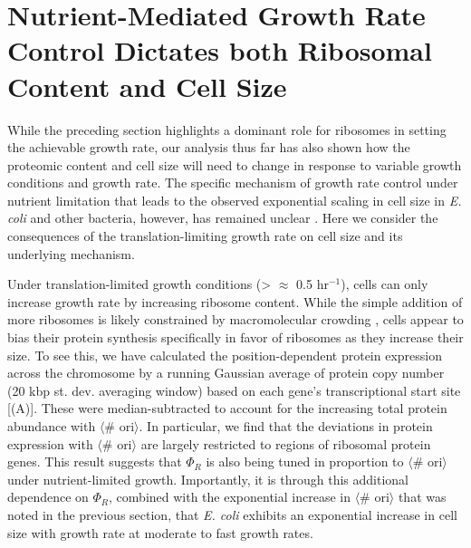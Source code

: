 \section{Nutrient-Mediated Growth Rate Control Dictates both Ribosomal Content and Cell Size}
\label{sec:minimal_model}
While the preceding section highlights a dominant role for ribosomes in setting
the achievable growth rate, our analysis thus far has also shown how the
proteomic content and cell size will need to change in response to variable
growth conditions and growth rate. The specific mechanism of growth rate control
under nutrient limitation that leads to the observed exponential scaling in cell
size in \textit{E. coli} and other bacteria, however, has remained unclear
\citep{si2017, harris2018, ojkic2019}. Here we consider the consequences of the
translation-limiting growth rate on cell size and its underlying mechanism.

Under translation-limited growth conditions (> $\approx$ 0.5 hr$^{-1}$), cells can
only increase growth rate by increasing ribosome content. While the simple
addition of more ribosomes is likely constrained by macromolecular crowding
\citep{delarue2018, solerbistue2020}, cells appear to bias their protein
synthesis specifically in favor of ribosomes as they increase their size. To see
this, we have calculated the position-dependent protein expression across the
chromosome by a running Gaussian average of protein copy number (20 kbp st. dev.
averaging window) based on each gene's transcriptional start site
[(A)]. These were median-subtracted to account  for
the increasing total protein abundance with $\langle$\# ori$\rangle$. In
particular, we find that the deviations in protein expression with $\langle$\#
ori$\rangle$ are largely restricted to regions of ribosomal protein genes. This
result suggests that $\Phi_R$ is also being tuned in proportion to $\langle$\#
ori$\rangle$ under nutrient-limited growth. Importantly, it is through this
additional dependence on $\Phi_R$, combined with the exponential increase in
$\langle$\# ori$\rangle$ that was noted in the previous section, that \textit{E.
coli} exhibits an exponential increase in cell size with growth rate at moderate to
fast growth rates.

